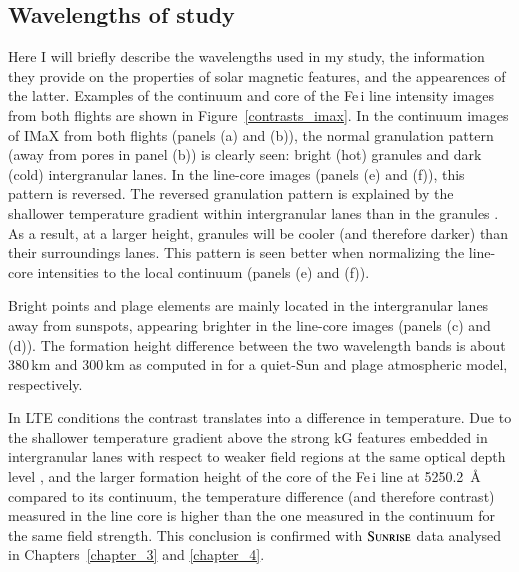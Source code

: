 \documentclass[goettingen, gauss, print]{thesis}
\begin{document}
\subsection{Wavelengths of study}

Here I will briefly describe the wavelengths used in my study, the information they provide on the properties of solar magnetic features, and the appearences of the latter. Examples of the continuum and core of the Fe\,{\sc i} line intensity images from both flights are shown in Figure~\ref{contrasts_imax}.
In the continuum images of IMaX from both flights (panels (a) and (b)), the normal granulation pattern (away from pores in panel (b)) is clearly seen: bright (hot) granules and dark (cold) intergranular lanes. In the line-core images (panels (e) and (f)), this pattern is reversed. The reversed granulation pattern is explained by the shallower temperature gradient within intergranular lanes than in the granules \citep{cheung_origin_2007}. As a result, at a larger height, granules will be cooler (and therefore darker) than their surroundings lanes. This pattern is seen better when normalizing the line-core intensities to the local continuum (panels (e) and (f)).

Bright points and plage elements are mainly located in the intergranular lanes away from sunspots, appearing brighter in the line-core images (panels (c) and (d)). The formation height difference between the two wavelength bands is about 380\,km and 300\,km as computed in \cite{jafarzadeh_inclinations_2014} for a quiet-Sun and plage atmospheric model, respectively. 

In LTE conditions the contrast translates into a difference in temperature. Due to the shallower temperature gradient above the strong kG features embedded in intergranular lanes with respect to weaker field regions at the same optical depth level \citep{lagg_fully_2010}, and the larger formation height of the core of the Fe\,{\sc i} line at 5250.2\, \AA{} compared to its continuum, the temperature difference (and therefore contrast) measured in the line core is higher than the one measured in the continuum for the same field strength. This conclusion is confirmed with $\textsc{Sunrise}$ data analysed in Chapters~\ref{chapter_3} and \ref{chapter_4}. 
\end{document}
